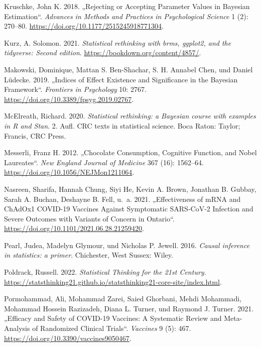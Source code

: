 \documentclass[
  a4paper,
  DIV=11]{scrreprt}
\newlength{\cslhangindent}
\newlength{\cslentryspacingunit} %
\newenvironment{CSLReferences}[2] %
 {%
  \setlength{\parindent}{0pt}
  \ifodd #1
  \let\oldpar\par
  \def\par{\hangindent=\cslhangindent\oldpar}
  \fi
  \setlength{\parskip}{#2\cslentryspacingunit}
 }%
 {}
\theoremstyle{definition}
\theoremstyle{remark}
\begin{document}
\begin{CSLReferences}{1}{0}
\leavevmode{}%
Kruschke, John K. 2018. {„Rejecting or Accepting Parameter Values in
Bayesian Estimation``}. \emph{Advances in Methods and Practices in
Psychological Science} 1 (2): 270--80.
\url{https://doi.org/10.1177/2515245918771304}.

\leavevmode{}%
Kurz, A. Solomon. 2021. \emph{Statistical rethinking with brms, ggplot2,
and the tidyverse: Second edition}.
\url{https://bookdown.org/content/4857/}.

\leavevmode{}%
Makowski, Dominique, Mattan S. Ben-Shachar, S. H. Annabel Chen, und
Daniel Lüdecke. 2019. {„Indices of Effect Existence and Significance in
the Bayesian Framework``}. \emph{Frontiers in Psychology} 10: 2767.
\url{https://doi.org/10.3389/fpsyg.2019.02767}.

\leavevmode{}%
McElreath, Richard. 2020. \emph{Statistical rethinking: a Bayesian
course with examples in R and Stan}. 2. Aufl. {CRC} texts in statistical
science. Boca Raton: Taylor; Francis, {CRC} Press.

\leavevmode{}%
Messerli, Franz H. 2012. {„Chocolate Consumption, Cognitive Function,
and Nobel Laureates``}. \emph{New England Journal of Medicine} 367 (16):
1562--64. \url{https://doi.org/10.1056/NEJMon1211064}.

\leavevmode{}%
Nasreen, Sharifa, Hannah Chung, Siyi He, Kevin A. Brown, Jonathan B.
Gubbay, Sarah A. Buchan, Deshayne B. Fell, u.~a. 2021. {„Effectiveness
of {mRNA} and {ChAdOx}1 {COVID}-19 Vaccines Against Symptomatic
{SARS}-{CoV}-2 Infection and Severe Outcomes with Variants of Concern in
Ontario``}. \url{https://doi.org/10.1101/2021.06.28.21259420}.

\leavevmode{}%
Pearl, Judea, Madelyn Glymour, und Nicholas P. Jewell. 2016.
\emph{Causal inference in statistics: a primer}. Chichester, West
Sussex: Wiley.

\leavevmode{}%
Poldrack, Russell. 2022. \emph{Statistical Thinking for the 21st
Century}.
\url{https://statsthinking21.github.io/statsthinking21-core-site/index.html}.

\leavevmode{}%
Pormohammad, Ali, Mohammad Zarei, Saied Ghorbani, Mehdi Mohammadi,
Mohammad Hossein Razizadeh, Diana L. Turner, und Raymond J. Turner.
2021. {„Efficacy and Safety of {COVID}-19 Vaccines: A Systematic Review
and Meta-Analysis of Randomized Clinical Trials``}. \emph{Vaccines} 9
(5): 467. \url{https://doi.org/10.3390/vaccines9050467}.


\end{CSLReferences}
\end{document}

